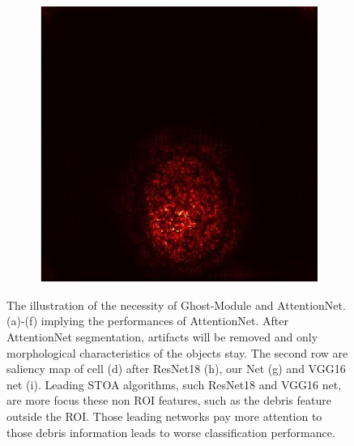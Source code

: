 \begin{figure}[h]
\begin{center}
\begin{subfigure}[b]{0.33\textwidth}
			\includegraphics[height= 0.20\textheight]{thesis-template-master/images/hd1 (4550)vggnetWithcellyolo.jpg}
			\caption{}
			\label{fig:cellnet}
		\end{subfigure}
	\end{center}
	\caption{The illustration of the necessity of Ghost-Module and AttentionNet. (a)-(f) implying the performances of AttentionNet. After AttentionNet segmentation, artifacts will be removed and only morphological characteristics of the objects stay. The second row are saliency map of cell (d) after ResNet18\cite{b20} (h), our Net (g) and VGG16 net \cite{b23} (i). Leading  STOA  algorithms, such ResNet18 and VGG16 net, are  more focus  these  non  ROI  features,  such  as  the  debris  feature  outside the ROI. Those leading networks pay more attention to those debris information leads to worse classification performance.}
\end{figure}

